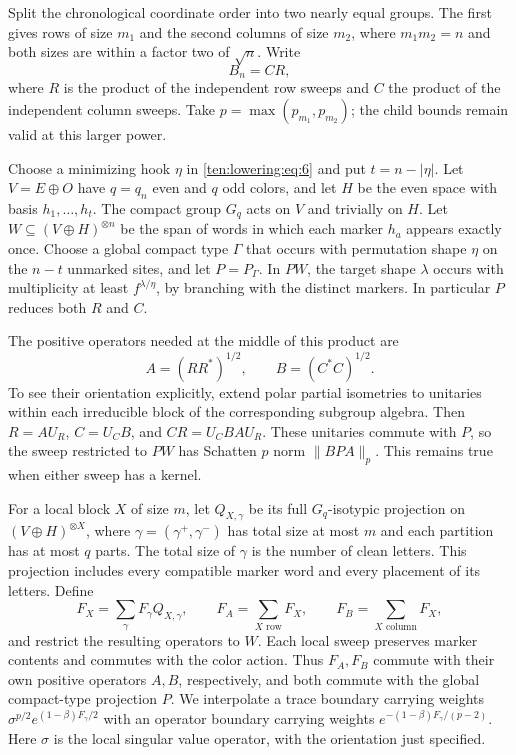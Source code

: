 Split the chronological coordinate order into two nearly equal groups.
The first gives rows of size $m_1$ and the second columns of size $m_2$,
where $m_1m_2=n$ and both sizes are within a factor two of $\sqrt n$.
Write
\[
 B_n=CR,
\]
where $R$ is the product of the independent row sweeps and $C$ the
product of the independent column sweeps. Take
$p=\max(p_{m_1},p_{m_2})$; the child bounds remain valid at this
larger power.

Choose a minimizing hook $\eta$ in \eqref{ten:lowering:eq:6} and put
$t=n-|\eta|$. Let $V=E\oplus O$ have $q=q_n$ even and $q$ odd
colors, and let $H$ be the even space with basis $h_1,\ldots,h_t$.
The compact group $G_q$ acts on $V$ and trivially on $H$. Let
$W\subseteq(V\oplus H)^{\otimes n}$ be the span of words in which
each marker $h_a$ appears exactly once. Choose a global compact type
$\Gamma$ that occurs with permutation shape $\eta$ on the $n-t$
unmarked sites, and let $P=P_\Gamma$. In $PW$, the target shape
$\lambda$ occurs with multiplicity at least $f^{\lambda/\eta}$,
by branching with the distinct markers. In particular $P$ reduces
both $R$ and $C$.

The positive operators needed at the middle of this product are
\[
 A=(RR^*)^{1/2},\qquad B=(C^*C)^{1/2}.
\]
To see their orientation explicitly, extend polar partial isometries
to unitaries within each irreducible block of the corresponding
subgroup algebra. Then $R=AU_R$, $C=U_CB$, and
$CR=U_CBAU_R$. These unitaries commute with $P$, so the sweep restricted to $PW$
has Schatten $p$ norm $\|BPA\|_p$. This remains true when either
sweep has a kernel.

For a local block $X$ of size $m$, let $Q_{X,\gamma}$ be its full
$G_q$-isotypic projection on $(V\oplus H)^{\otimes X}$, where
$\gamma=(\gamma^+,\gamma^-)$ has total size at most $m$ and each
partition has at most $q$ parts. The total size of $\gamma$ is the
number of clean letters. This projection includes every compatible
marker word and every placement of its letters. Define
\[
 F_X=\sum_\gamma F_\gamma Q_{X,\gamma},\qquad
 F_A=\sum_{X\text{ row}}F_X,\qquad
 F_B=\sum_{X\text{ column}}F_X,
\]
and restrict the resulting operators to $W$. Each local sweep
preserves marker contents and commutes with the color action. Thus
$F_A,F_B$ commute with their own positive operators $A,B$, respectively,
and both commute with the global compact-type projection $P$.
We interpolate a trace boundary carrying weights
$\sigma^{p/2}e^{(1-\beta)F_\gamma/2}$ with an operator boundary
carrying weights $e^{-(1-\beta)F_\gamma/(p-2)}$. Here $\sigma$
is the local singular value operator, with the orientation just
specified.


